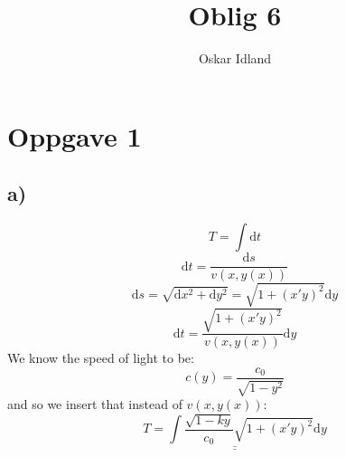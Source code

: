 \documentclass{article}
\author{Oskar Idland}
\title{Oblig 6}
\date{}
\begin{document}
\maketitle
\newpage
\section*{Oppgave 1}
\subsection*{a)}
\[
T = ∫ \mathrm{d}t
\]
\[
\mathrm{d}t = \frac{\mathrm{d}s}{v(x,y(x))}
\]
\[
\mathrm{d}s = \sqrt{\mathrm{d}x^2 + \mathrm{d}y^2} = \sqrt{1 + \left(x'y\right)^2} \mathrm{d}y
\]
\[
\mathrm{d}t = \frac{\sqrt{1 + \left(x'y\right)^2}}{v(x,y(x))} \mathrm{d}y
\]
We know the speed of light to be:
\[
c(y) = \frac{c_0}{\sqrt{1 - y^2}}
\]
and so we insert that instead of $v(x,y(x))$:
\[
\underline{\underline{T = ∫ \frac{\sqrt{1-ky}}{c_0} \sqrt{1 + \left(x'y\right)^2} \mathrm{d}y}}
\]
\end{document}
